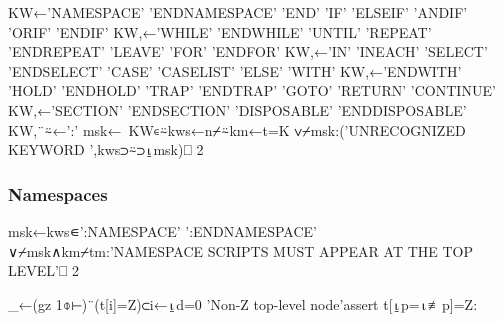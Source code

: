\documentclass{article}%
\begin{document}
\nwenddocs{}\endmoddef\nwstartdeflinemarkup{}\nwenddeflinemarkup
KW←'NAMESPACE' 'ENDNAMESPACE' 'END' 'IF' 'ELSEIF' 'ANDIF' 'ORIF' 'ENDIF'
KW,←'WHILE' 'ENDWHILE' 'UNTIL' 'REPEAT' 'ENDREPEAT' 'LEAVE' 'FOR' 'ENDFOR'
KW,←'IN' 'INEACH' 'SELECT' 'ENDSELECT' 'CASE' 'CASELIST' 'ELSE' 'WITH'
KW,←'ENDWITH' 'HOLD' 'ENDHOLD' 'TRAP' 'ENDTRAP' 'GOTO' 'RETURN' 'CONTINUE'
KW,←'SECTION' 'ENDSECTION' 'DISPOSABLE' 'ENDDISPOSABLE'
KW,¨⍨←':'
msk←~KW∊⍨kws←n⌿⍨km←t=K
∨⌿msk:('UNRECOGNIZED KEYWORD ',kws⊃⍨⊃⍸msk)⎕ 2
\nwendcode{}\nwdocspar

\subsubsection{Namespaces}

\nwenddocs{}\endmoddef\nwstartdeflinemarkup{}\nwenddeflinemarkup
msk←kws∊':NAMESPACE' ':ENDNAMESPACE'
∨⌿msk∧km⌿tm:'NAMESPACE SCRIPTS MUST APPEAR AT THE TOP LEVEL'⎕ 2
\nwendcode{}\nwdocspar

\nwenddocs{}\endmoddef\nwstartdeflinemarkup{}\nwenddeflinemarkup
_←(gz 1⌽⊢)¨(t[i]=Z)⊂i←⍸d=0
'Non-Z top-level node'assert t[⍸p=⍳≢p]=Z:
\nwendcode{}\nwdocspar
\end{document}
